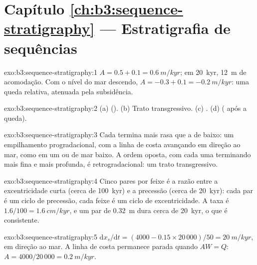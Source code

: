 \section*{Capítulo \ref{ch:b3:sequence-stratigraphy} --- Estratigrafia de sequências}

\begin{solution}{exo:b3:sequence-stratigraphy:1}
$A = 0.5 + 0.1 = \qty{0.6}{m/kyr}$; em \qty{20}{kyr}, \qty{12}{m} de
acomodação. Com o nível do mar descendo, $A = -0.3 + 0.1 = \qty{-0.2}{m/kyr}$: uma
queda relativa, atenuada pela subsidência.
\end{solution}

\begin{solution}{exo:b3:sequence-stratigraphy:2}
(a)  (). (b) Trato transgressivo. (c)
. (d)  ( após a queda).
\end{solution}

\begin{solution}{exo:b3:sequence-stratigraphy:3}
Cada  termina mais rasa que a de baixo: um empilhamento progradacional,
com a linha de costa avançando em direção ao mar, como em um  ou de mar baixo. A
ordem oposta, com cada uma terminando mais fina e mais profunda, é retrogradacional: um
trato transgressivo.
\end{solution}

\begin{solution}{exo:b3:sequence-stratigraphy:4}
Cinco pares por feixe é a razão entre a excentricidade curta (cerca de
\qty{100}{kyr}) e a precessão (cerca de \qty{20}{kyr}): cada par é um
ciclo de precessão, cada feixe é um ciclo de excentricidade. A taxa é
$1.6/100 = \qty{1.6}{cm/kyr}$, e um par de \qty{0.32}{m} dura cerca de
\qty{20}{kyr}, o que é consistente.
\end{solution}

\begin{solution}{exo:b3:sequence-stratigraphy:5}
$\mathrm dx_s/\mathrm dt = (4000 - 0.15\times20\,000)/50 = \qty{20}{m/kyr}$,
em direção ao mar. A linha de costa permanece parada quando $AW = Q$: $A = 4000/20\,000 =
\qty{0.2}{m/kyr}$.
\end{solution}

